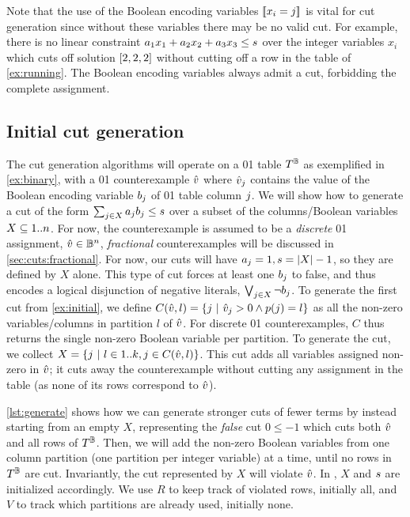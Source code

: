 \documentclass[a4paper,UKenglish,cleveref,autoref,thm-restate]{lipics-v2021}
\begin{document}
Note that the use of the Boolean encoding variables $\be{i}{j}$ is vital for cut generation since without these variables there may be no valid cut. 
For example, there is no linear constraint $a_1 x_1 + a_2 x_2 + a_3 x_3 \leq s$ over the integer variables $x_i$ which cuts off solution $[2,2,2]$ without cutting off a row in the table of \cref{ex:running}.
The Boolean encoding variables always admit a cut, \eg forbidding the complete assignment.

\subsection{Initial cut generation}
\label{sec:cuts:initial}

The cut generation algorithms will operate on a 01 table $T^{\mathbb{B}}$ as exemplified in \cref{ex:binary}, with a 01 counterexample $\hat{v}$ where $\hat{v}_j$ contains the value of the Boolean encoding variable $b_{j}$ of 01 table column $j$.
We will show how to generate a cut of the form $\sum_{j \in X} a_j b_j \leq s$ over a subset of the columns/Boolean variables $X \subseteq 1..n$.
For now, the counterexample is assumed to be a \textit{discrete} 01 assignment, $\hat{v} \in \mathbb{B}^n$, \textit{fractional} counterexamples will be discussed in \cref{sec:cuts:fractional}.
For now, our cuts will have $a_j=1, s=|X|-1$, so they are defined by $X$ alone.
This type of cut forces at least one $b_j$ to false, and thus encodes a logical disjunction of negative literals, $\bigvee_{j \in X} \neg b_j$.
To generate the first cut from \cref{ex:initial}, we define $C(\hat{v},l) = \{j ~|~ \hat{v}_j > 0 \wedge p(j) = l\}$ as all the non-zero variables/columns in partition $l$ of $\hat{v}$.
For discrete 01 counterexamples, $C$ thus returns the single non-zero Boolean variable per partition.
To generate the cut, we collect $X = \{j ~|~ l \in 1..k, j \in C(\hat{v}, l)\}$.
This cut adds all variables assigned non-zero in $\hat{v}$; it cuts away the counterexample without cutting any assignment in the table (as none of its rows correspond to $\hat{v}$).

\cref{lst:generate} shows how we can generate stronger cuts of fewer terms by instead starting from an empty $X$, representing the \textit{false} cut $0 \leq -1$ which cuts both $\hat{v}$ and all rows of $T^{\mathbb{B}}$.
Then, we will add the non-zero Boolean variables from one column partition (\ie one partition per integer variable) at a time, until no rows in $T^{\mathbb{B}}$ are cut.
Invariantly, the cut represented by $X$ will violate $\hat{v}$.
In , $X$ and $s$ are initialized accordingly.
We use $R$ to keep track of violated rows, initially all, and
 $V$ to track which partitions are already used, initially none.
\end{document}
